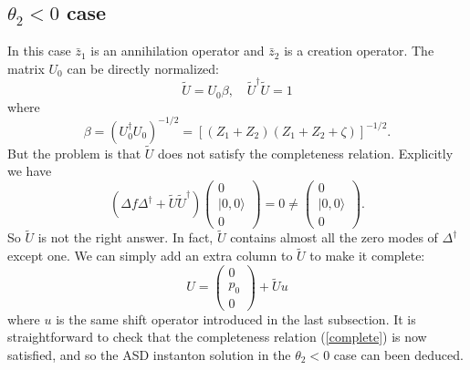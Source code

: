 \documentclass[a4paper,a4paper]{article}
\begin{document}
\subsection{$\theta_2<0$ case}
In this case $\bar z_1$ is an annihilation operator and $\bar z_2$
is a creation operator. The matrix $U_0$ can be directly
normalized:
\begin{equation}
\tilde{U}=U_0\beta,\quad\tilde{U}^\dag\tilde{U}=1
\end{equation}
where
\begin{equation}
\beta=(U_0^\dag U_0)^{-1/2}=[(Z_1+Z_2)(Z_1+Z_2+\zeta)]^{-1/2}.
\end{equation}
But the problem is that $\tilde{U}$ does not satisfy the
completeness relation. Explicitly we have
\begin{equation} (\Delta
f\Delta^\dag+\tilde{U}\tilde{U}^\dag)\left(
\begin{array}{c} 0 \\ |0,0\rangle \\ 0 \end{array}\right)=0
\neq\left(\begin{array}{c} 0 \\ |0,0\rangle \\ 0 \end{array}
\right).
\end{equation}
So $\tilde{U}$ is not the right answer. In fact, $\tilde{U}$
contains almost all the zero modes of $\Delta^\dag$ except one. We
can simply add an extra column to $\tilde{U}$ to make it complete:
\begin{equation}
U=\left(\begin{array}{c} 0 \\ p_0 \\ 0 \end{array}\right)+\tilde{U}u
\end{equation}
where $u$ is the same shift operator introduced in the last
subsection. It is straightforward to check that the completeness
relation (\ref{complete}) is now satisfied, and so the ASD
instanton solution in the $\theta_2<0$ case can been deduced.
\end{document}
